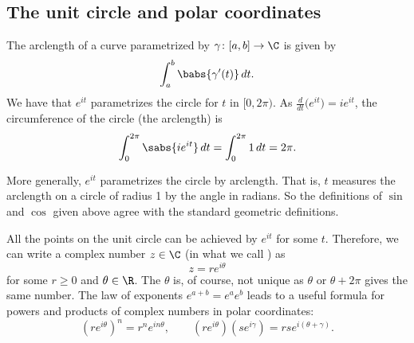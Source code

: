 \subsection{The unit circle and polar coordinates}

The arclength of a curve parametrized by $\gamma \colon [a,b] \to \C$ is given
by
\begin{equation*}
\int_a^b \babs{\gamma'(t)} \, dt .
\end{equation*}
We have that $e^{it}$ parametrizes the circle for $t$ in $[0,2\pi)$.
As $\frac{d}{dt} \bigl( e^{it} \bigr) = ie^{it}$, the circumference of the
circle (the arclength) is
\begin{equation*}
\int_0^{2\pi} \sabs{i e^{it}}  \,  dt
=
\int_0^{2\pi} 1  \,  dt  = 2\pi .
\end{equation*}

More generally, $e^{it}$ parametrizes the circle by arclength.
That is, $t$ measures the arclength on a circle of radius 1 by
the angle in radians.  So the definitions of $\sin$ and $\cos$ given
above agree with the standard geometric definitions.

All the points on the unit circle can be achieved by
$e^{it}$ for some $t$.
Therefore,
we can write
a complex number $z \in \C$
(in what we call \emph{}) as
\begin{equation*}
z = r e^{i\theta}
\end{equation*}
for some $r \geq 0$ and $\theta \in \R$.  The $\theta$ is, of course,
not unique as $\theta$ or $\theta+2\pi$ gives the same number.
The law of exponents $e^{a+b} = e^a e^b$ leads to a useful formula for powers
and products of complex numbers in polar coordinates:
\begin{equation*}
{(r e^{i\theta})}^n
= r^n e^{i n \theta} ,
\qquad
(r e^{i\theta})
(s e^{i\gamma})
=
rs e^{i(\theta+\gamma)} .
\end{equation*}

